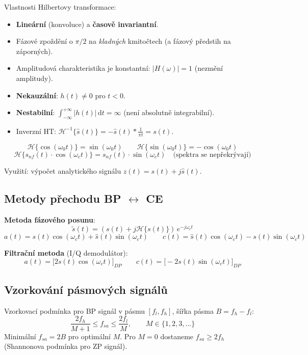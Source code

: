 \documentclass[12pt,a4paper]{article}
\newcommand{\dd}{\mathrm{d}}
\begin{document}
Vlastnosti Hilbertovy transformace:
\begin{itemize}
  \item \textbf{Lineární} (konvoluce) a \textbf{časově invariantní}.
  \item Fázové zpoždění o $\pi/2$ na \emph{kladných} kmitočtech (a fázový předstih na záporných).
  \item Amplitudová charakteristika je konstantní: $|H(\omega)| = 1$ (nezmění amplitudy).
  \item \textbf{Nekauzální}: $h(t) \neq 0$ pro $t < 0$.
  \item \textbf{Nestabilní}: $\int_{-\infty}^{+\infty}|h(t)|\,\dd t = \infty$ (není absolutně integrabilní).
  \item Inverzní HT: $\mathcal{H}^{-1}\{\hat{s}(t)\} = -\hat{s}(t)*\frac{1}{\pi t} = s(t)$.
\end{itemize}

\begin{matBox}
\[
  \mathcal{H}\{\cos(\omega_0 t)\} = \sin(\omega_0 t)
  \qquad
  \mathcal{H}\{\sin(\omega_0 t)\} = -\cos(\omega_0 t)
\]
\[
  \mathcal{H}\{s_{nf}(t)\cdot\cos(\omega_c t)\} = s_{nf}(t)\cdot\sin(\omega_c t)
  \quad\text{(spektra se nepřekrývají)}
\]
\end{matBox}

Využití: výpočet analytického signálu $z(t) = s(t) + j\hat{s}(t)$.

\subsection*{Metody přechodu BP $\leftrightarrow$ CE}

\textbf{Metoda fázového posunu}:
\[
  \tilde{s}(t) = (s(t) + j\mathcal{H}\{s(t)\})\,e^{-j\omega_c t}
\]
\[
  a(t) = s(t)\cos(\omega_c t) + \hat{s}(t)\sin(\omega_c t)
  \qquad
  c(t) = \hat{s}(t)\cos(\omega_c t) - s(t)\sin(\omega_c t)
\]

\textbf{Filtrační metoda} (I/Q demodulátor):
\[
  a(t) = \bigl[2s(t)\cos(\omega_c t)\bigr]_{DP}
  \qquad
  c(t) = \bigl[-2s(t)\sin(\omega_c t)\bigr]_{DP}
\]

\subsection*{Vzorkování pásmových signálů}

Vzorkovací podmínka pro BP signál v pásmu $[f_l, f_h]$, šířka pásma $B = f_h - f_l$:
\[
  \frac{2f_h}{M+1} \leq f_{sa} \leq \frac{2f_l}{M},
  \qquad M \in \{1, 2, 3, \ldots\}
\]
Minimální $f_{sa} = 2B$ pro optimální $M$. Pro $M=0$ dostaneme $f_{sa} \geq 2f_h$ (Shannonova podmínka pro ZP signál).
\end{document}
